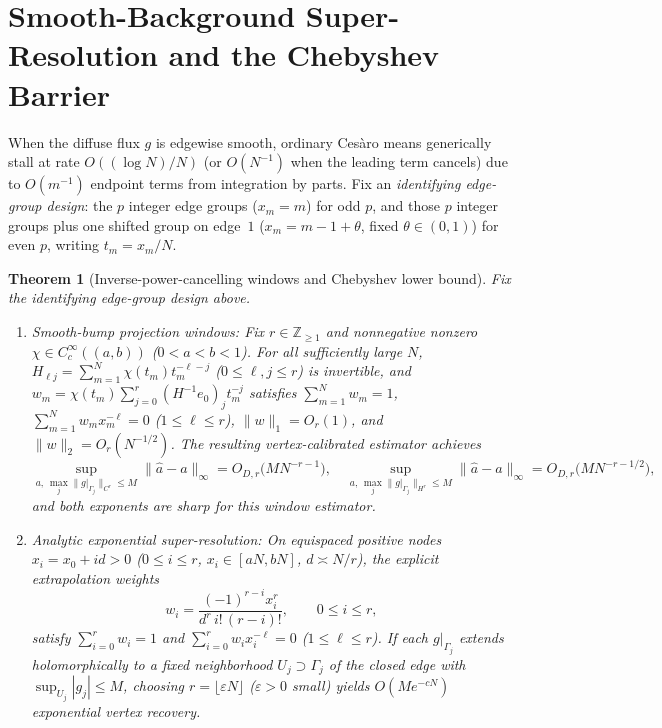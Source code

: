 \documentclass[11pt,reqno]{amsart}
\newtheorem{theorem}{Theorem}[section]
\theoremstyle{definition}
\theoremstyle{remark}
\newcommand{\Z}{\mathbb{Z}}
\begin{document}
\section{Smooth-Background Super-Resolution and the Chebyshev Barrier}\label{sec:superres}

When the diffuse flux $g$ is edgewise smooth, ordinary Ces\`aro means generically stall at rate $O((\log N)/N)$ (or $O(N^{-1})$ when the leading term cancels) due to $O(m^{-1})$ endpoint terms from integration by parts. Fix an \emph{identifying edge-group design}: the $p$ integer edge groups ($x_m = m$) for odd $p$, and those $p$ integer groups plus one shifted group on edge~$1$ ($x_m = m - 1 + \theta$, fixed $\theta \in (0,1)$) for even $p$, writing $t_m = x_m / N$.

\begin{theorem}[Inverse-power-cancelling windows and Chebyshev lower bound]\label{thm:superres}
Fix the identifying edge-group design above.
\begin{enumerate}
  \item \emph{Smooth-bump projection windows}: Fix $r \in \Z_{\ge 1}$ and nonnegative nonzero $\chi \in C_c^\infty((a,b))$ ($0 < a < b < 1$). For all sufficiently large $N$, $H_{\ell j} = \sum_{m=1}^N \chi(t_m) t_m^{-\ell-j}$ ($0 \le \ell, j \le r$) is invertible, and $w_m = \chi(t_m)\sum_{j=0}^r (H^{-1} e_0)_j t_m^{-j}$ satisfies $\sum_{m=1}^N w_m = 1$, $\sum_{m=1}^N w_m x_m^{-\ell} = 0$ ($1 \le \ell \le r$), $\|w\|_1 = O_r(1)$, and $\|w\|_2 = O_r(N^{-1/2})$. The resulting vertex-calibrated estimator achieves
  \begin{equation}\label{eq:smooth-rates}
    \sup_{a,\,\max_j \|g|_{\Gamma_j}\|_{C^r} \le M} \|\widehat a - a\|_\infty = O_{D,r}\bigl(M N^{-r-1}\bigr), \quad
    \sup_{a,\,\max_j \|g|_{\Gamma_j}\|_{H^r} \le M} \|\widehat a - a\|_\infty = O_{D,r}\bigl(M N^{-r-1/2}\bigr),
  \end{equation}
  and both exponents are sharp for this window estimator.
  \item \emph{Analytic exponential super-resolution}: On equispaced positive nodes $x_i = x_0 + i d > 0$ ($0 \le i \le r$, $x_i \in [a N, b N]$, $d \asymp N/r$), the explicit extrapolation weights
  \begin{equation}\label{eq:extrap-weights}
    w_i = \frac{(-1)^{r-i} x_i^r}{d^r\, i!\,(r - i)!}, \qquad 0 \le i \le r,
  \end{equation}
  satisfy $\sum_{i=0}^r w_i = 1$ and $\sum_{i=0}^r w_i x_i^{-\ell} = 0$ ($1 \le \ell \le r$). If each $g|_{\Gamma_j}$ extends holomorphically to a fixed neighborhood $U_j \supset \Gamma_j$ of the closed edge with $\sup_{U_j}|g_j| \le M$, choosing $r = \lfloor \varepsilon N \rfloor$ ($\varepsilon > 0$ small) yields $O(M e^{-c N})$ exponential vertex recovery.

\end{enumerate}
\end{theorem}
\end{document}

